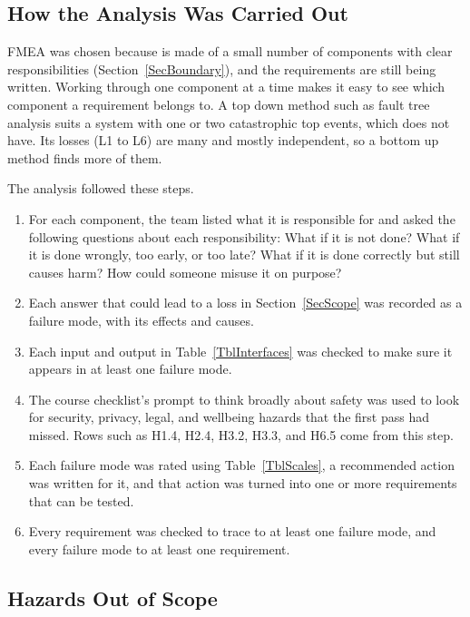 \documentclass{article}
\begin{document}
\subsection{How the Analysis Was Carried Out}

FMEA was chosen because \progname{} is made of a small number of components
with clear responsibilities (Section~\ref{SecBoundary}), and the requirements
are still being written. Working through one component at a time makes it
easy to see which component a requirement belongs to. A top down method such
as fault tree analysis suits a system with one or two catastrophic top events,
which \progname{} does not have. Its losses (L1 to L6) are many and mostly
independent, so a bottom up method finds more of them.

The analysis followed these steps.
\begin{enumerate}
  \item For each component, the team listed what it is responsible for and
        asked the following questions about each responsibility: What if it
        is not done? What if it is done wrongly, too early, or too late? What
        if it is done correctly but still causes harm? How could someone
        misuse it on purpose?
  \item Each answer that could lead to a loss in Section~\ref{SecScope} was
        recorded as a failure mode, with its effects and causes.
  \item Each input and output in Table~\ref{TblInterfaces} was checked to
        make sure it appears in at least one failure mode.
  \item The course checklist's prompt to think broadly about safety was used
        to look for security, privacy, legal, and wellbeing hazards that the
        first pass had missed. Rows such as H1.4, H2.4, H3.2, H3.3, and H6.5
        come from this step.
  \item Each failure mode was rated using Table~\ref{TblScales}, a recommended
        action was written for it, and that action was turned into one or more
        requirements that can be tested.
  \item Every requirement was checked to trace to at least one failure mode,
        and every failure mode to at least one requirement.
\end{enumerate}

\subsection{Hazards Out of Scope}
\end{document}
